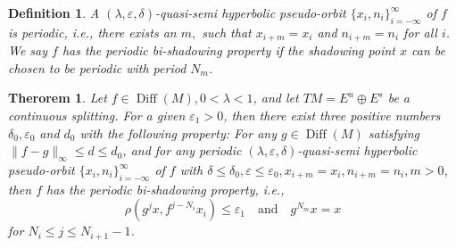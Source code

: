 \documentclass[12pt]{article}
\newtheorem{theorem}{Therorem}[section]
\newtheorem{definition}{Definition}[section]
\begin{document}
\begin{definition}
    A $(\lambda,\varepsilon,\delta)$-quasi-semi hyperbolic pseudo-orbit $  \{x_{i},n_{i}\}_{i=-\infty}^{\infty} $ of $ f $ is periodic, i.e., there exists an $ m, $ such that $ x_{i+m}=x_{i} $ and $ n_{i+m}=n_{i} $ for all $ i $. We say $ f $ has the periodic bi-shadowing property if the shadowing point $  x $ can be chosen to be periodic with period $ N_{m} $.
\end{definition}

\begin{theorem}\label{th:4.2}
	Let $f \in \operatorname{Diff}(M),0 < \lambda < 1 $, and let $TM=E^u \oplus E^s$ be a continuous splitting. For a given $ \varepsilon_1>0 $, then there exist three positive numbers   $\delta_0, \varepsilon_0$ and $d_0$ with the following property: For any $g \in \operatorname{Diff}(M)$ satisfying $ \|f - g\|_\infty\leqslant d \leqslant d_0 $, and for any periodic $(\lambda,\varepsilon,\delta)$-quasi-semi hyperbolic pseudo-orbit $  \{x_{i},n_{i}\}_{i=-\infty}^{\infty} $ of $ f $ with $ \delta\leqslant\delta_0,\varepsilon\leqslant\varepsilon_0,x_{i+m}=x_{i},n_{i+m}=n_{i},m>0 $, then $ f $ has the periodic bi-shadowing property, i.e., $$ \rho(g^j x,f^{j-N_{i}}x_{i})\leqslant\varepsilon_1\quad \text{and} \quad g^{N_{m}}x=x $$ for $ N_{i}\leqslant j\leqslant N_{i+1}-1 $.
\end{theorem}
\end{document}
